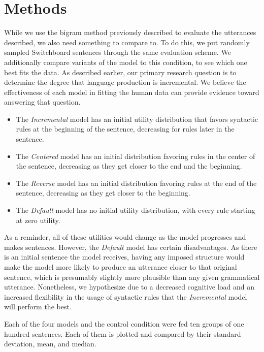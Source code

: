 \section{Methods}
While we use the bigram method previously described to evaluate the utterances described, we also need something to compare to. To do this, we put randomly sampled Switchboard sentences through the same evaluation scheme. We additionally compare variants of the model to this condition, to see which one best fits the data. As described earlier, our primary research question is to determine the degree that language production is incremental. We believe the effectiveness of each model in fitting the human data can provide evidence toward answering that question.

\begin{itemize}
\item The \textit{Incremental} model has an initial utility distribution that favors syntactic rules at the beginning of the sentence, decreasing for rules later in the sentence.
\item The \textit{Centered} model has an initial distribution favoring rules in the center of the sentence, decreasing as they get closer to the end and the beginning.
\item The \textit{Reverse} model has an initial distribution favoring rules at the end of the sentence, decreasing as they get closer to the beginning.
\item The \textit{Default} model has no initial utility distribution, with every rule starting at zero utility.
\end{itemize}

As a reminder, all of these utilities would change as the model progresses and makes sentences. However, the \textit{Default} model has certain disadvantages. As there is an initial sentence the model receives, having any imposed structure would make the model more likely to produce an utterance closer to that original sentence, which is presumably slightly more plausible than any given grammatical utterance. Nonetheless, we hypothesize due to a decreased cognitive load and an increased flexibility in the usage of syntactic rules that the \textit{Incremental} model will perform the best.

Each of the four models and the control condition were fed ten groups of one hundred sentences. Each of them is plotted and compared by their standard deviation, mean, and median.